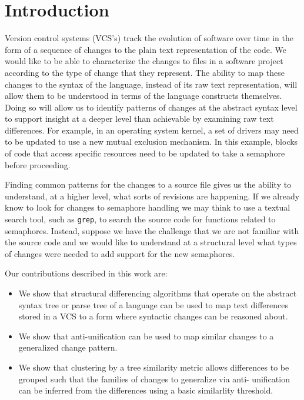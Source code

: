 \section{Introduction}

Version control systems (VCS's) track the evolution of software over time in the form
of a sequence of changes to the plain text representation of the code.
We would like to be able to characterize the changes to files in a software
project according to the type of change that they represent.  The ability to
map these changes to the syntax of the language, instead of its raw text
representation, will allow them to be understood in terms of the language
constructs themselves.  Doing so will allow us to identify patterns of
changes at the abstract syntax level to support insight at a deeper level
than achievable by examining raw text differences.  For example, in
an operating system kernel, a set of drivers may need to be updated to use a
new mutual exclusion mechanism. In this example, blocks of code that access
specific resources need to be updated to take a semaphore before proceeding.

Finding common patterns for the changes to a source file gives us the ability
to understand, at a higher level, what sorts of revisions are happening. If we
already know to look for changes to semaphore handling we may think to use a
textual search tool, such as {\tt grep}, to search the source code for
functions related to semaphores. Instead, suppose we have the challenge that we
are not familiar with the source code and we would like to understand at a
structural level what types of changes were needed to add support for the new
semaphores.

Our contributions described in this work are:

\begin{itemize}

\item We show that structural differencing algorithms that operate on the
abstract syntax tree or parse tree of a language can be used to map text
differences stored in a VCS to a form where syntactic changes can be reasoned
about.

\item We show that anti-unification can be used to map similar changes to a
generalized change pattern.

\item We show that clustering by a tree similarity metric allows differences
to be grouped such that the families of changes to generalize via anti-
unification can be inferred from the differences using a basic similarlity
threshold.

\end{itemize}

